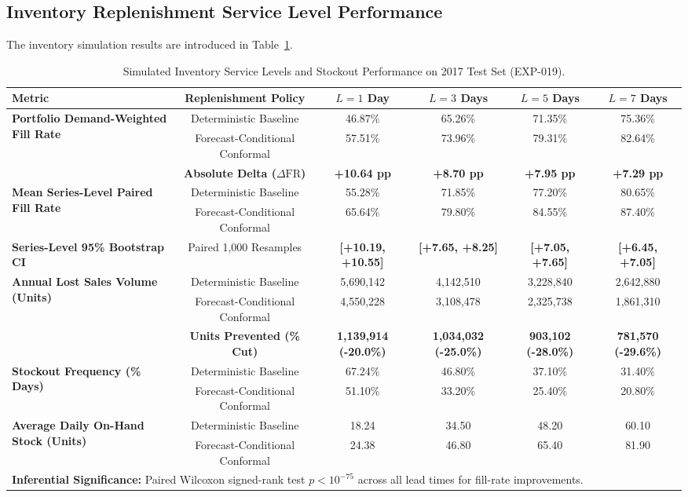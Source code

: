 \documentclass[11pt,a4paper]{article}
\begin{document}
\subsection{Inventory Replenishment Service Level Performance}
\label{sec:res_service}
The inventory simulation results are introduced in Table~\ref{tab:inventory_service}.

\begin{table}[htbp]
\centering
\small
\caption{Simulated Inventory Service Levels and Stockout Performance on 2017 Test Set (EXP-019).}
\label{tab:inventory_service}
\begin{tabular}{lccccc}
\toprule
\textbf{Metric} & \textbf{Replenishment Policy} & \textbf{$L=1$ Day} & \textbf{$L=3$ Days} & \textbf{$L=5$ Days} & \textbf{$L=7$ Days} \\
\midrule
\multirow{3}{*}{\textbf{Portfolio Demand-Weighted Fill Rate}} 
& Deterministic Baseline & 46.87\% & 65.26\% & 71.35\% & 75.36\% \\
& Forecast-Conditional Conformal & 57.51\% & 73.96\% & 79.31\% & 82.64\% \\
& \textbf{Absolute Delta ($\Delta \text{FR}$)} & \textbf{+10.64 pp} & \textbf{+8.70 pp} & \textbf{+7.95 pp} & \textbf{+7.29 pp} \\
\midrule
\multirow{2}{*}{\textbf{Mean Series-Level Paired Fill Rate}} 
& Deterministic Baseline & 55.28\% & 71.85\% & 77.20\% & 80.65\% \\
& Forecast-Conditional Conformal & 65.64\% & 79.80\% & 84.55\% & 87.40\% \\
\textbf{Series-Level 95\% Bootstrap CI} & Paired 1,000 Resamples & \textbf{[+10.19, +10.55]} & \textbf{[+7.65, +8.25]} & \textbf{[+7.05, +7.65]} & \textbf{[+6.45, +7.05]} \\
\midrule
\multirow{3}{*}{\textbf{Annual Lost Sales Volume (Units)}} 
& Deterministic Baseline & 5,690,142 & 4,142,510 & 3,228,840 & 2,642,880 \\
& Forecast-Conditional Conformal & 4,550,228 & 3,108,478 & 2,325,738 & 1,861,310 \\
& \textbf{Units Prevented (\% Cut)} & \textbf{1,139,914 (-20.0\%)} & \textbf{1,034,032 (-25.0\%)} & \textbf{903,102 (-28.0\%)} & \textbf{781,570 (-29.6\%)} \\
\midrule
\multirow{2}{*}{\textbf{Stockout Frequency (\% Days)}} 
& Deterministic Baseline & 67.24\% & 46.80\% & 37.10\% & 31.40\% \\
& Forecast-Conditional Conformal & 51.10\% & 33.20\% & 25.40\% & 20.80\% \\
\midrule
\multirow{2}{*}{\textbf{Average Daily On-Hand Stock (Units)}} 
& Deterministic Baseline & 18.24 & 34.50 & 48.20 & 60.10 \\
& Forecast-Conditional Conformal & 24.38 & 46.80 & 65.40 & 81.90 \\
\bottomrule
\multicolumn{6}{l}{\textbf{Inferential Significance:} Paired Wilcoxon signed-rank test $p < 10^{-75}$ across all lead times for fill-rate improvements.} \\
\end{tabular}
\end{table}
\end{document}

